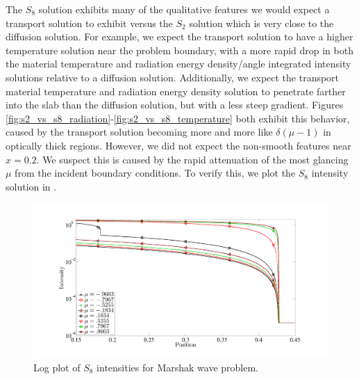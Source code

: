 The $S_8$ solution exhibits many of the qualitative features we would expect a transport solution to exhibit versus the $S_2$ solution which is very close to the diffusion solution.
For example, we expect the transport solution to have a higher temperature solution near the problem boundary, with a more rapid drop in both the material temperature and radiation energy density/angle integrated intensity solutions relative to a diffusion solution.
Additionally, we expect the transport material temperature and radiation energy density solution to penetrate farther into the slab than the diffusion solution, but with a less steep gradient.
Figures \ref{fig:s2_vs_s8_radiation}-\ref{fig:s2_vs_s8_temperature} both exhibit this behavior, caused by the transport solution becoming more and more like $\delta(\mu-1)$ in optically thick regions. 
However, we did not expect the non-smooth features near $x=0.2$.
We suspect this is caused by the rapid attenuation of the most glancing $\mu$ from the incident boundary conditions.
To verify this, we plot the $S_8$ intensity solution in .
\begin{figure}[!htp]
\centering
\includegraphics[width=16cm,trim=1.5in  0.5in 0.2in 1in,clip=true]{chapter6_grey_radtran/S8_Intensity_SemiLogy.pdf}
\caption{Log plot of $S_8$ intensities for Marshak wave problem.}
\label{fig:s8_intensity_full}
\end{figure}

